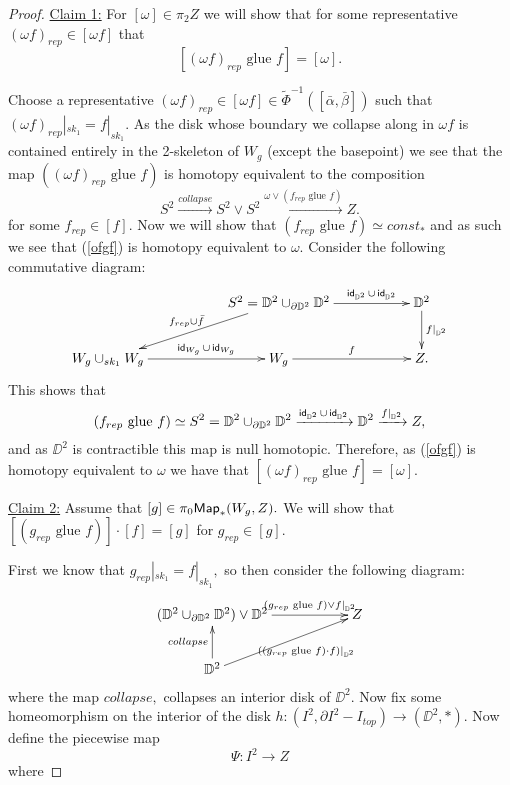 \documentclass{amsart}
\theoremstyle{definition}
\theoremstyle{remark}
\newcommand{\xra}{\xrightarrow}
\DeclareMathOperator{\id}{\sf id}
\begin{document}
\begin{proof}
\noindent \underline{Claim 1:} For $[\omega] \in \pi_{2}Z$ we will show that for some representative $(\omega f)_{rep} \in [\omega f]$ that $$[(\omega f)_{rep}  \text{ glue } f] = [\omega].$$

\noindent Choose a representative $(\omega f)_{rep} \in [\omega f] \in \tilde{\Phi}^{-1}([\bar{\alpha}, \bar{\beta}])$ such that $(\omega f)_{rep}|_{sk_{1}} = f|_{sk_{1}}.$ As the disk whose boundary we collapse along in $\omega f$ is contained entirely in the 2-skeleton of $W_{g}$ (except the basepoint) we see that the map $((\omega f )_{rep} \text{ glue } f)$ is homotopy equivalent to the composition
\begin{equation} \label{ofgf}
S^{2} \xra{collapse} S^{2} \vee S^{2} \xra{\omega \vee (f_{rep}  \text{ glue } f)} Z.
\end{equation}
for some $f_{rep} \in [f].$ Now we will show that $(f_{rep}  \text{ glue } f) \simeq const_{*}$ and as such we see that (\ref{ofgf}) is homotopy equivalent to $\omega.$ Consider the following commutative diagram: 
$$ %
\xymatrix{
&& 
S^{2} = \DD^{2} \cup_{\partial \DD^{2}} \DD^{2} \ar[rr]^-{\id_{\DD^{2}} \cup \id_{\DD^{2}}} \ar[dll]_-{f_{rep} \cup \bar{f}}
&&
\DD^{2} \ar[d]^-{f|_{\DD^{2}}}
\\
W_{g} \cup_{sk_{1}} W_{g} \ar[rr]^-{\id_{W_{g}} \cup \id_{W_{g}}}
&&
W_{g} \ar[rr]^-{f} 
&&
Z.
}$$
This shows that $$(f_{rep}  \text{ glue } f) \simeq S^{2} = \DD^{2} \cup_{\partial \DD^{2}} \DD^{2} \xra{\id_{\DD^{2}} \cup \id_{\DD^{2}}} \DD^{2} \xra{f|_{\DD^{2}}} Z,$$ and as $\DD^{2}$ is contractible this map is null homotopic. Therefore, as (\ref{ofgf}) is homotopy equivalent to $\omega$ we have that $[(\omega f )_{rep} \text{ glue } f] = [\omega].$ \newline

\noindent \underline{Claim 2:}  Assume that $[g] \in \pi_{0}{\sf Map}_{\ast}(W_{g}, Z).$ We will show that $[(g_{rep} \text{ glue } f)] \cdot [f] = [g]$ for $g_{rep} \in [g].$ \newline


\noindent  First we know that $ g_{rep}|_{sk_{1}} = f|_{sk_{1}},$ so then consider the following diagram: 
$$
\xymatrix{
(\DD^{2} \cup_{\partial \DD^{2}} \DD^{2}) \vee \DD^{2}  \ar[rr]^-{(g_{rep} \text{ glue } f) \vee f|_{\DD^{2}}} 
&&
Z
\\
\DD^{2} \ar[u]^-{collapse} \ar[urr]_-{((g_{rep} \text{ glue } f) \cdot f)|_{\DD^{2}}}
&&
}$$
where the map $collapse,$ collapses an interior disk of $\DD^{2}.$ Now fix some homeomorphism on the interior of the disk $h: (I^{2}, \partial I^{2} - I_{top}) \rightarrow (\DD^{2}, \ast).$ Now define the piecewise map 
$$\Psi: I^{2} \longrightarrow Z$$ where
 

\end{proof}
\end{document}
